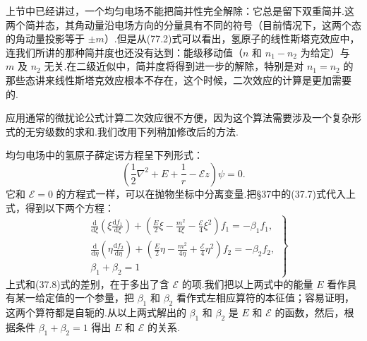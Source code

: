 上节中已经讲过，一个均匀电场不能把简并性完全解除：它总是留下双重简并.这两个简并态，其角动量沿电场方向的分量具有不同的符号（目前情况下，这两个态的角动量投影等于 $\pm m$）.但是从(77.2)式可以看出，氢原子的线性斯塔克效应中，连我们所讲的那种简并度也还没有达到：能级移动值（$n$ 和 $n_1-n_2$ 为给定）与 $m$ 及 $n_2$ 无关.在二级近似中，简并度将得到进一步的解除，特别是对 $n_1=n_2$ 的那些态讲来线性斯塔克效应根本不存在，这个时候，二次效应的计算是更加需要的.

应用通常的微扰论公式计算二次效应很不方便，因为这个算法需要涉及一个复杂形式的无穷级数的求和.我们改用下列稍加修改后的方法.

均匀电场中的氢原子薛定谔方程呈下列形式：
\begin{equation*}
  \left(\frac{1}{2}\nabla^{2}+E+\frac{1}{r}-\mathcal{E}z\right)\psi=0.
\end{equation*}
它和 $\mathcal{E}=0$ 的方程式一样，可以在抛物坐标中分离变量.把§37中的(37.7)式代入上式，得到以下两个方程：
\begin{equation}
\left.\begin{aligned}
  &\frac{\mathrm{d}}{\mathrm{d}\xi}\left(\xi\frac{\mathrm{d}f_1}{\mathrm{d}\xi}\right)
  +\left(\frac{E}{2}\xi-\frac{m^{2}}{4\xi}-\frac{\mathcal{E}}{4}\xi^{2}\right)f_1=-\beta_1f_1,\\
  &\frac{\mathrm{d}}{\mathrm{d}\eta}\left(\eta\frac{\mathrm{d}f_2}{\mathrm{d}\eta}\right)
  +\left(\frac{E}{2}\eta-\frac{m^{2}}{4\eta}+\frac{\mathcal{E}}{4}\eta^{2}\right)f_2=-\beta_2f_2,\\
  &\beta_1+\beta_2=1
\end{aligned}\right\}
\end{equation}
上式和(37.8)式的差别，在于多出了含 $\mathcal{E}$ 的项.我们把以上两式中的能量 $E$ 看作具有某一给定值的一个参量，把 $\beta_1$ 和 $\beta_2$ 看作式左相应算符的本征值；容易证明，这两个算符都是自轭的.从以上两式解出的 $\beta_1$ 和 $\beta_2$ 是 $E$ 和 $\mathcal{E}$ 的函数，然后，根据条件 $\beta_1+\beta_2=1$ 得出 $E$ 和 $\mathcal{E}$ 的关系.

